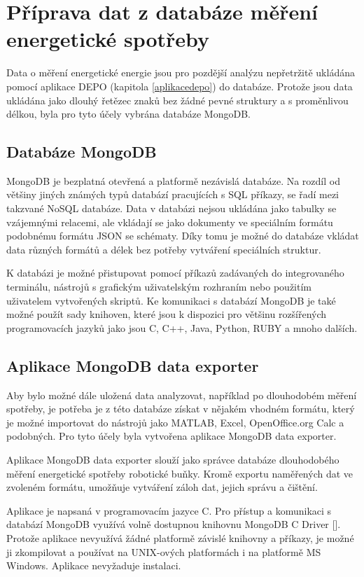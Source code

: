\chapter{Příprava dat z databáze měření energetické spotřeby}

Data o měření energetické energie jsou pro pozdější analýzu nepřetržitě ukládána pomocí aplikace DEPO (kapitola \ref{aplikacedepo}) do databáze. Protože jsou data ukládána jako dlouhý řetězec znaků bez žádné pevné struktury a s proměnlivou délkou, byla pro tyto účely vybrána databáze MongoDB. 

\section{Databáze MongoDB}

MongoDB je bezplatná otevřená a platformě nezávislá databáze. Na rozdíl od většiny jiných známých typů databází pracujících s SQL příkazy, se řadí mezi takzvané NoSQL databáze. Data v databázi nejsou ukládána jako tabulky se vzájemnými relacemi, ale vkládají se jako dokumenty ve speciálním formátu podobnému formátu JSON se schématy. Díky tomu je možné do databáze vkládat data různých formátů a délek bez potřeby vytváření speciálních struktur. 

K databázi je možné přistupovat pomocí příkazů zadávaných do integrovaného terminálu, nástrojů s grafickým uživatelským rozhraním nebo použitím uživatelem vytvořených skriptů. Ke komunikaci s databází MongoDB je také možné použít sady knihoven, které jsou k dispozici pro většinu rozšířených programovacích jazyků jako jsou C, C++, Java, Python, RUBY a mnoho dalších.     

\section{Aplikace MongoDB data exporter}

Aby bylo možné dále uložená data analyzovat, například po dlouhodobém měření spotřeby, je potřeba je z této databáze získat v nějakém vhodném formátu, který je možné importovat do nástrojů jako MATLAB, Excel, OpenOffice.org Calc a podobných. Pro tyto účely byla vytvořena aplikace MongoDB data exporter. 

Aplikace MongoDB data exporter slouží jako správce databáze dlouhodobého měření energetické spotřeby robotické buňky. Kromě exportu naměřených dat ve zvoleném formátu, umožňuje vytváření záloh dat, jejich správu a čištění. 

Aplikace je napsaná v programovacím jazyce C. Pro přístup a komunikaci s databází MongoDB využívá volně dostupnou knihovnu MongoDB C Driver [\cite{mongocdriver}]. Protože aplikace nevyužívá žádné platformě závislé knihovny a příkazy, je možné ji zkompilovat a používat na UNIX-ových platformách i na platformě MS Windows. Aplikace nevyžaduje instalaci. 

